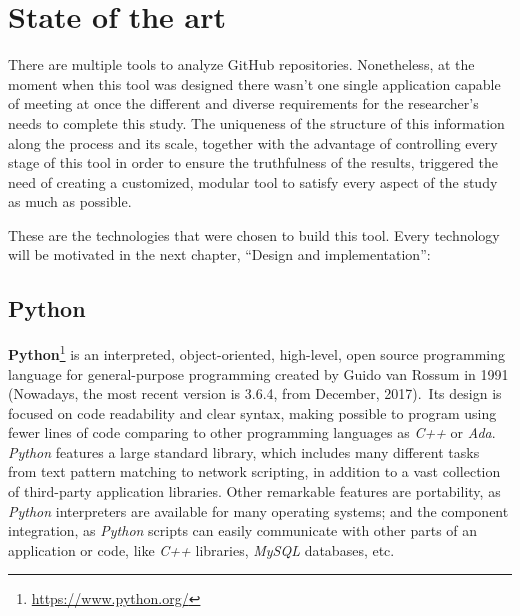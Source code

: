 \documentclass[a4paper, 12pt]{book}
\begin{document}
\chapter{State of the art}
\label{sec:state-art}
There are multiple tools to analyze GitHub repositories. Nonetheless, at the moment when this tool was designed
there wasn't one single application capable of meeting at once the different and diverse requirements for the
researcher's needs to complete this study.
The uniqueness of the structure of this information along the process and its scale, together with the advantage of
controlling every stage of this tool in order to ensure the truthfulness of the results, triggered the need of
creating a customized, modular tool to satisfy every aspect of the study as much as possible.\par
These are the technologies that were chosen to build this tool. Every technology will be motivated in the next chapter,
``Design and implementation'':
\section{Python}
\label{sec:python}
\textbf{Python}\footnote{\url{https://www.python.org/}} is an interpreted, object-oriented, high-level, open source
programming language for general-purpose programming created by Guido van Rossum in 1991 (Nowadays, the most
recent version is 3.6.4, from December, 2017).\ Its design is focused on code readability and clear syntax, making
possible to program using fewer lines of code comparing to other programming languages as \emph{C++} or \emph{Ada}.\\
\emph{Python} features a large standard library, which includes many different tasks from text pattern matching to network
scripting, in addition to a vast collection of third-party application libraries.
Other remarkable features are portability, as \emph{Python} interpreters are available for many operating systems;
and the component integration, as \emph{Python} scripts can easily communicate with other parts of an application or code,
like \emph{C++} libraries, \emph{MySQL} databases, etc.\\
\end{document}
